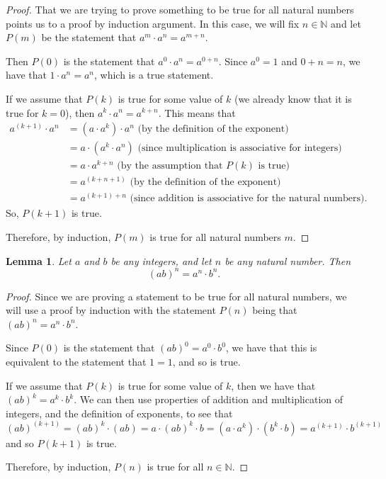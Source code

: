 \documentclass[
]{book}
\newtheorem{lemma}{Lemma}[chapter]
\theoremstyle{definition}
\theoremstyle{definition}
\theoremstyle{definition}
\theoremstyle{definition}
\theoremstyle{remark}
\begin{document}
\begin{proof}
That we are trying to prove something to be true for all natural numbers points us to a proof by induction argument. In this case, we will fix \(n\in \mathbb{N}\) and let \(P(m)\) be the statement that \(a^m\cdot a^n=a^{m+n}\).

Then \(P(0)\) is the statement that \(a^0\cdot a^n = a^{0+n}\). Since \(a^0=1\) and \(0+n=n\), we have that \(1\cdot a^n = a^n\), which is a true statement.

If we assume that \(P(k)\) is true for some value of \(k\) (we already know that it is true for \(k=0\)), then \(a^k\cdot a^n = a^{k+n}\). This means that
\begin{align*}
    a^{(k+1)} \cdot a^n & = (a \cdot a^k) \cdot a^n \mbox{ (by the definition of the exponent)} \\
    &= a \cdot (a^k\cdot a^n) \mbox{ (since multiplication is associative for integers)} \\
    &= a \cdot a^{k+n} \mbox{ (by the assumption that $P(k)$ is true)} \\
    &= a^{(k+n+1)} \mbox{ (by the definition of the exponent)} \\
    &= a^{(k+1)+n} \mbox{ (since addition is associative for the natural numbers)}.
\end{align*}
So, \(P(k+1)\) is true.

Therefore, by induction, \(P(m)\) is true for all natural numbers \(m\).
\end{proof}

\begin{lemma}
Let \(a\) and \(b\) be any integers, and let \(n\) be any natural number. Then \[(ab)^n=a^n \cdot b^n.\]
\end{lemma}

\begin{proof}
Since we are proving a statement to be true for all natural numbers, we will use a proof by induction with the statement \(P(n)\) being that \((ab)^n=a^n\cdot b^n\).

Since \(P(0)\) is the statement that \((ab)^0=a^0 \cdot b^0\), we have that this is equivalent to the statement that \(1=1\), and so is true.

If we assume that \(P(k)\) is true for some value of \(k\), then we have that \((ab)^k=a^k\cdot b^k\). We can then use properties of addition and multiplication of integers, and the definition of exponents, to see that \[(ab)^{(k+1)}= (ab)^k\cdot (ab) = a\cdot (ab)^k \cdot b = (a\cdot a^k) \cdot (b^k\cdot b)  = a^{(k+1)} \cdot b^{(k+1)}\] and so \(P(k+1)\) is true.

Therefore, by induction, \(P(n)\) is true for all \(n\in \mathbb{N}\).
\end{proof}
\end{document}
